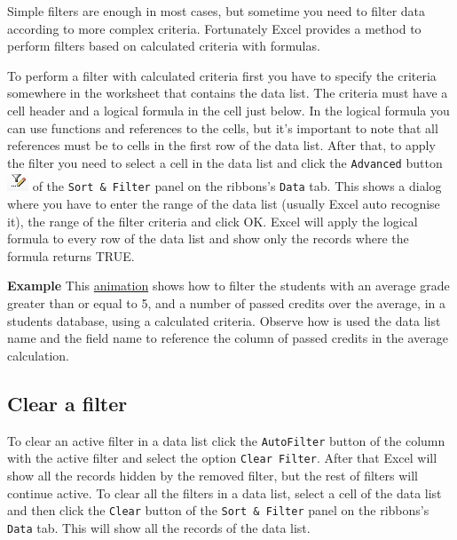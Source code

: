 Simple filters are enough in most cases, but sometime you need to filter data according to more complex criteria. Fortunately Excel provides a method to perform filters based on calculated criteria with formulas.

To perform a filter with calculated criteria first you have to specify the criteria somewhere in the worksheet that
contains the data list. The criteria must have a cell header and a logical formula in the cell just below. In the
logical formula you can use functions and references to the cells, but it's important to note that all references must
be to cells in the first row of the data list. After that, to apply the filter you need to select a cell in the data
list and click the \texttt{Advanced} button \includegraphics[scale=0.7]{../img/button_advanced_filter.png} of the
\texttt{Sort \& Filter} panel on the ribbons's \texttt{Data} tab. This shows a dialog where you have to enter the range of the data list (usually Excel auto recognise it), the range of the filter criteria and click OK. Excel will apply the logical formula to every row of the data list and show only the records where the formula returns TRUE.

\textbf{Example} This \href{http://aprendeconalf.es/office/excel/manual/img/example_database_filtering_calculated_criteria.gif}{animation} shows how to filter the students with an average grade greater than or equal to 5, and a number of passed credits over the average, in a students database, using a calculated criteria. Observe how is used the data list name and the field name to reference the column of passed credits in the average calculation.

\subsection{Clear a filter}\hypertarget{clear-a-filter}{}\label{clear-a-filter}

To clear an active filter in a data list click the \texttt{AutoFilter} button of the column with the active filter and select the option \texttt{Clear Filter}. After that Excel will show all the records hidden by the removed filter, but the rest of filters will continue active. To clear all the filters in a data list, select a cell of the data list and then click the \texttt{Clear} button of the \texttt{Sort \& Filter} panel on the ribbons's \texttt{Data} tab. This will show all the records of the data list.

